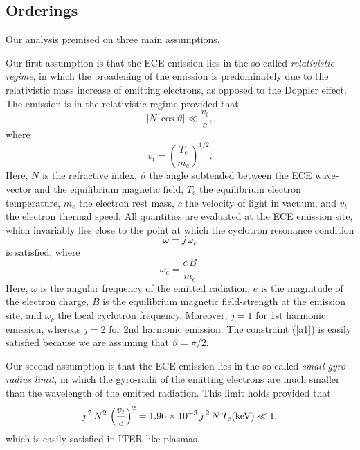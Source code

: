 \documentclass[12pt,prb,aps]{revtex4-1}
\begin{document}
\subsection{Orderings}
Our analysis premised on three main assumptions. 

Our first assumption is that the ECE emission lies in the so-called {\em relativistic regime}, in which the
broadening of the emission is predominately due to the relativistic mass increase of emitting electrons, as opposed to the Doppler effect. The
emission is in the relativistic regime provided that
\begin{equation}\label{a1}
|N\,\cos\vartheta|  \ll \frac{v_t}{c},
\end{equation}
where
\begin{equation}
v_t = \left(\frac{T_e}{m_e}\right)^{1/2}.
\end{equation}
Here, $N$ is the refractive index, $\vartheta$ the angle subtended between the ECE wave-vector and the equilibrium magnetic field, $T_e$ the equilibrium electron
temperature, $m_e$ the electron rest mass, $c$ the velocity of light in vacuum, and $v_t$ the electron thermal speed.  All quantities are evaluated at the ECE emission site, which invariably
lies 
close to the point at which the cyclotron resonance condition
\begin{equation}
\omega = j\,\omega_c
\end{equation}
is satisfied, 
where 
\begin{equation}
\omega_c = \frac{e\,B}{m_e}.
\end{equation}
Here, $\omega$ is the angular frequency of the emitted radiation, $e$ is the magnitude of the electron charge, $B$ is the equilibrium magnetic field-strength at the emission site, and $\omega_c$  the local cyclotron frequency. 
Moreover, $j=1$ for 1st harmonic emission, whereas $j=2$ for 2nd harmonic emission. The constraint (\ref{a1}) is easily satisfied because we are assuming that
$\vartheta=\pi/2$. 

Our second assumption is that the ECE emission lies in the so-called {\em small gyro-radius limit}, in which the gyro-radii of the emitting electrons are much smaller than
the wavelength of the emitted radiation. This limit holds provided that 
\begin{equation}
j^{\,2}\,N^2\,\left(\frac{v_t}{c}\right)^2 = 1.96\times 10^{-3}\,j^{\,2}\,N\,T_e({\rm keV}) \ll 1,
\end{equation}
which is easily satisfied in ITER-like plasmas. 
\end{document}
